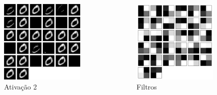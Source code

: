 \documentclass[tikz,10pt]{beamer}
\begin{document}
\begin{frame}
\begin{columns}
		\begin{column}{0.33\textwidth}
			\begin{figure}
				\includegraphics[height=4cm]{images/resultados/network_1/input_1_layer_activation_2}%
				\caption{Ativação 2}
			\end{figure}%
		\end{column}
		\begin{column}{0.33\textwidth}
			\begin{figure}
				\includegraphics[height=4cm]{images/resultados/network_1/filter_convolution2d_3}%
				\caption{Filtros}			
			\end{figure}%
		\end{column}	
	\end{columns}
	
\end{frame}
\end{document}
